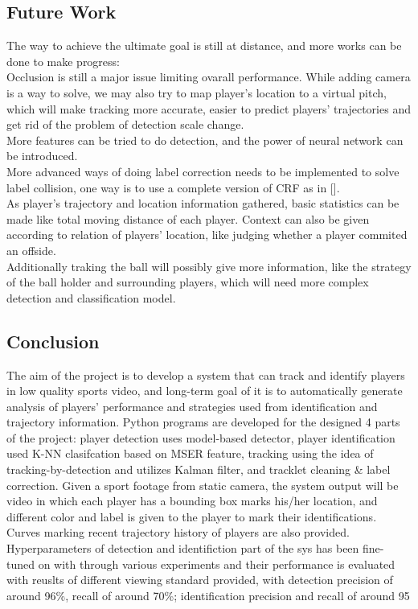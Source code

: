 \documentclass{article}
\begin{document}
\subsection{Future Work}
The way to achieve the ultimate goal is still at distance, and more works can be done to make progress:\\
Occlusion is still a major issue limiting ovarall performance. While adding camera is a way to solve, we may also try to map player's location to a virtual pitch, which will make tracking more accurate, easier to predict players' trajectories and get rid of the problem of detection scale change.\\
More features can be tried to do detection, and the power of neural network can be introduced.\\
More advanced ways of doing label correction needs to be implemented to solve label collision, one way is to use a complete version of CRF as in [].\\
As player's trajectory and location information gathered, basic statistics can be made like total moving distance of each player. Context can also be given according to relation of players' location, like judging whether a player commited an offside.\\
Additionally traking the ball will possibly give more information, like the strategy of the ball holder and surrounding players, which will need more complex detection and classification model.
\subsection{Conclusion}
The aim of the project is to develop a system that can track and identify players in low quality sports video, and long-term goal of it is to automatically generate analysis of players' performance and strategies used from identification and trajectory information. Python programs are developed for the designed 4 parts of the project: player detection uses model-based detector, player identification used K-NN clasifcation based on MSER feature, tracking using the idea of tracking-by-detection and utilizes Kalman filter, and tracklet cleaning \& label correction. Given a sport footage from static camera, the system output will be video in which each player has a bounding box marks his/her location, and different color and label is given to the player to mark their identifications. Curves marking recent trajectory history of players are also provided. Hyperparameters of detection and identifiction part of the sys has been fine-tuned on with through various experiments and their performance is evaluated with reuslts of different viewing standard provided, with detection precision of around 96\%, recall of around 70\%; identification precision and recall of around 95%
\newpage
\end{document}
